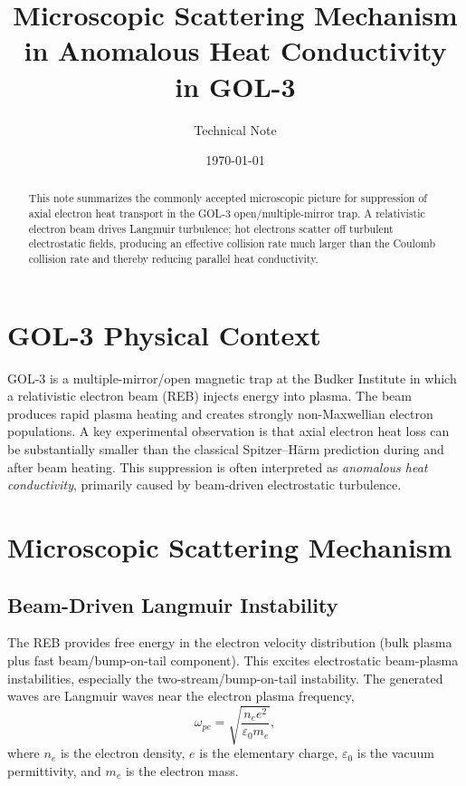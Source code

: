 \documentclass[11pt,a4paper]{article}
\title{Microscopic Scattering Mechanism in Anomalous Heat Conductivity in GOL-3}
\author{Technical Note}
\date{\today}
\begin{document}
\maketitle

\begin{abstract}
This note summarizes the commonly accepted microscopic picture for suppression of axial electron heat transport in the GOL-3 open/multiple-mirror trap. A relativistic electron beam drives Langmuir turbulence; hot electrons scatter off turbulent electrostatic fields, producing an effective collision rate much larger than the Coulomb collision rate and thereby reducing parallel heat conductivity.
\end{abstract}

\section{GOL-3 Physical Context}

GOL-3 is a multiple-mirror/open magnetic trap at the Budker Institute in which a relativistic electron beam (REB) injects energy into plasma. The beam produces rapid plasma heating and creates strongly non-Maxwellian electron populations. A key experimental observation is that axial electron heat loss can be substantially smaller than the classical Spitzer--H\"arm prediction during and after beam heating. This suppression is often interpreted as \emph{anomalous heat conductivity}, primarily caused by beam-driven electrostatic turbulence.

\section{Microscopic Scattering Mechanism}

\subsection{Beam-Driven Langmuir Instability}
The REB provides free energy in the electron velocity distribution (bulk plasma plus fast beam/bump-on-tail component). This excites electrostatic beam-plasma instabilities, especially the two-stream/bump-on-tail instability. The generated waves are Langmuir waves near the electron plasma frequency,
\begin{equation}
    \omega_{pe} = \sqrt{\frac{n_e e^2}{\varepsilon_0 m_e}},
\end{equation}
where $n_e$ is the electron density, $e$ is the elementary charge, $\varepsilon_0$ is the vacuum permittivity, and $m_e$ is the electron mass.
\end{document}
